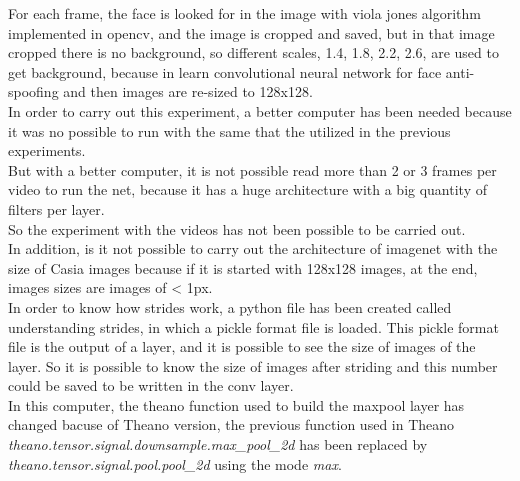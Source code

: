 For each frame, the face is looked for in the image with viola jones algorithm implemented in opencv, and the image is cropped and saved, but in that image cropped there is no background, so different scales, 1.4, 1.8, 2.2, 2.6, are used to get background, because in learn convolutional neural network for face anti-spoofing and then images are re-sized to 128x128.\\

In order to carry out this experiment, a better computer has been needed because it was no possible to run with the same that the utilized in the previous experiments.\\

But with a better computer, it is not possible read more than 2 or 3 frames per video to run the net, because it has a huge architecture with a big quantity of filters per layer.\\

So the experiment with the videos has not been possible to be carried out.\\

In addition, is it not possible to carry out the architecture of imagenet with the size of Casia images because if it is started with 128x128 images, at the end,  images sizes are images of < 1px.\\

In order to know how strides work, a python file has been created called understanding strides, in which a pickle format file is loaded. This pickle format file is the output of a layer, and it is possible to see the size of images of the layer. So it is possible to know the size of images after striding and this number could be saved to be written in the conv layer.\\

In this computer, the theano function used to build the max\-pool layer has changed bacuse of Theano version, the previous function used in Theano  \textit{theano.te\-nsor.sig\-nal.down\-sam\-ple.max\-\_pool\_2d} has been replaced by \textit{thea\-no.ten\-sor.sig\-nal.pool.pool\_2d} using the mode \textit{max}.\\

